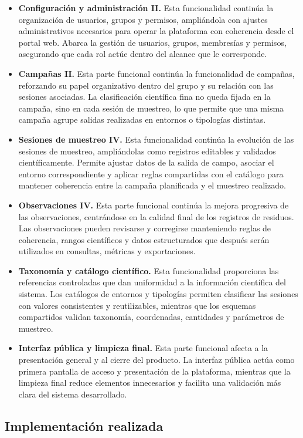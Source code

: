 \begin{itemize}[leftmargin=1.4em]
\item \textbf{Configuración y administración II.} Esta funcionalidad continúa la organización de usuarios, grupos y permisos, ampliándola con ajustes administrativos necesarios para operar la plataforma con coherencia desde el portal web. Abarca la gestión de usuarios, grupos, membresías y permisos, asegurando que cada rol actúe dentro del alcance que le corresponde.
\item \textbf{Campañas II.} Esta parte funcional continúa la funcionalidad de campañas, reforzando su papel organizativo dentro del grupo y su relación con las sesiones asociadas. La clasificación científica fina no queda fijada en la campaña, sino en cada sesión de muestreo, lo que permite que una misma campaña agrupe salidas realizadas en entornos o tipologías distintas.
\item \textbf{Sesiones de muestreo IV.} Esta funcionalidad continúa la evolución de las sesiones de muestreo, ampliándolas como registros editables y validados científicamente. Permite ajustar datos de la salida de campo, asociar el entorno correspondiente y aplicar reglas compartidas con el catálogo para mantener coherencia entre la campaña planificada y el muestreo realizado.
\item \textbf{Observaciones IV.} Esta parte funcional continúa la mejora progresiva de las observaciones, centrándose en la calidad final de los registros de residuos. Las observaciones pueden revisarse y corregirse manteniendo reglas de coherencia, rangos científicos y datos estructurados que después serán utilizados en consultas, métricas y exportaciones.
\item \textbf{Taxonomía y catálogo científico.} Esta funcionalidad proporciona las referencias controladas que dan uniformidad a la información científica del sistema. Los catálogos de entornos y tipologías permiten clasificar las sesiones con valores consistentes y reutilizables, mientras que los esquemas compartidos validan taxonomía, coordenadas, cantidades y parámetros de muestreo.
\item \textbf{Interfaz pública y limpieza final.} Esta parte funcional afecta a la presentación general y al cierre del producto. La interfaz pública actúa como primera pantalla de acceso y presentación de la plataforma, mientras que la limpieza final reduce elementos innecesarios y facilita una validación más clara del sistema desarrollado.
\end{itemize}
\subsection{Implementación realizada}

